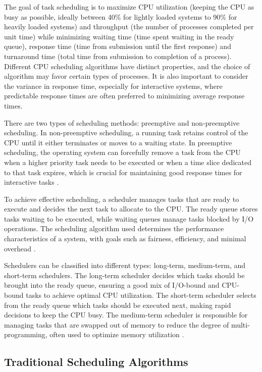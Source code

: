 The goal of task scheduling is to maximize CPU utilization (keeping the CPU as busy as possible, ideally between 40\% for lightly loaded systems to 90\% for heavily loaded systems) and throughput (the number of processes completed per unit time) while minimizing waiting time (time spent waiting in the ready queue), response time (time from submission until the first response) and turnaround time (total time from submission to completion of a process)\cite{silberschatz2018}. Different CPU scheduling algorithms have distinct properties, and the choice of algorithm may favor certain types of processes. It is also important to consider the variance in response time, especially for interactive systems, where predictable response times are often preferred to minimizing average response times.

There are two types of scheduling methods: preemptive and non-preemptive scheduling. In non-preemptive scheduling, a running task retains control of the CPU until it either terminates or moves to a waiting state. In preemptive scheduling, the operating system can forcefully remove a task from the CPU when a higher priority task needs to be executed or when a time slice dedicated to that task expires, which is crucial for maintaining good response times for interactive tasks \cite{krzyzanowski2015}.

To achieve effective scheduling, a scheduler manages tasks that are ready to execute and decides the next task to allocate to the CPU. The ready queue stores tasks waiting to be executed, while waiting queues manage tasks blocked by I/O operations. The scheduling algorithm used determines the performance characteristics of a system, with goals such as fairness, efficiency, and minimal overhead \cite{silberschatz2018}.

Schedulers can be classified into different types: long-term, medium-term, and short-term schedulers. The long-term scheduler decides which tasks should be brought into the ready queue, ensuring a good mix of I/O-bound and CPU-bound tasks to achieve optimal CPU utilization. The short-term scheduler selects from the ready queue which tasks should be executed next, making rapid decisions to keep the CPU busy. The medium-term scheduler is responsible for managing tasks that are swapped out of memory to reduce the degree of multi-programming, often used to optimize memory utilization \cite{chakraborty2024}.

\subsection{Traditional Scheduling Algorithms}

